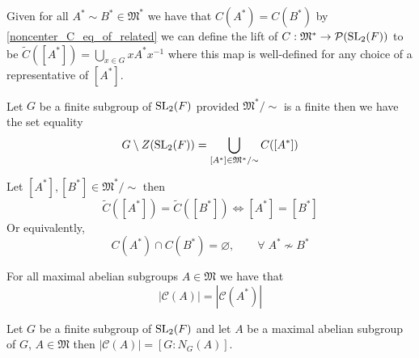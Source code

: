 \begin{definition}
\label{lift_noncenter_C}
\leanok
 Given for all $A^* \sim B^* \in \mathfrak{M}^*$ we have that $C(A^*) = C(B^*)$ by \ref{noncenter_C_eq_of_related} we can define the lift of $C : \mathfrak{M}^* \rightarrow \mathcal{P}(\operatorname{SL}_2(F))$ to be 
  $\tilde{C}([A^*]) = \bigcup_{x \in G} x A^* x^{-1}$ where this map is well-defined for any choice of a representative of $[A^*]$.
\end{definition}

\begin{theorem}
\label{union_lift_noncenter_C_eq_G_diff_center}
  Let $G$ be a finite subgroup of $\operatorname{SL}_2(F)$ provided $\mathfrak{M}^* / \sim$ is a finite then we have the set equality
  \[
   G \setminus Z(\operatorname{SL}_2(F)) = \bigcup_{[A^*] \in \mathfrak{M}^* / \sim} C([A^*])
  \]
\end{theorem}

\begin{theorem}
  \label{disjoint_of_ne_lift_noncenter_MaximalAbelianSubgroupsOf}
  Let $[A^*], [B^*] \in \mathfrak{M}^* / \sim$ then
  \[
  \tilde{C}([A^*]) = \tilde{C}([B^*]) \iff [A^*] = [B^*]
  \]
  Or equivalently,
  \[ 
  C(A^*) \cap C(B^*) = \varnothing, \qquad \forall \;  A^* \not\sim B^* 
  \]
\end{theorem}

\begin{theorem}
  \label{card_noncenter_ConjClassOfSet_eq_card_ConjClassOfSet}
  For all maximal abelian subgroups $A \in \mathfrak{M}$ we have that 
  \[
  |\mathcal{C}(A)| = |\mathcal{C}(A^*)|
  \]
\end{theorem}


\begin{theorem}
\label{card_ConjClassOfSet_eq_index_normalizer}

Let $G$ be a finite subgroup of $\operatorname{SL}_2(F)$ and let $A$ be a maximal abelian subgroup of $G$, 
$A \in \mathfrak{M}$ then $|\mathcal{C}(A)| = [G : N_G(A)]$.
\end{theorem}

